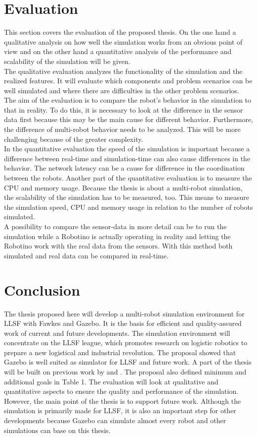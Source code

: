 \documentclass[11pt,a4paper]{article}
\begin{document}
\section{Evaluation}
This section covers the evaluation of the proposed thesis. On the one hand a qualitative analysis on how well the simulation works from an obvious point of view and on the other hand a quantitative analysis of the performance and scalability of the simulation will be given.\\
The qualitative evaluation analyzes the functionality of the simulation and the realized features. It will evaluate which components and problem scenarios can be well simulated and where there are difficulties in the other problem scenarios. The aim of the evaluation is to compare the robot's behavior in the simulation to that in reality. To do this, it is necessary to look at the difference in the sensor data first because this may be the main cause for different behavior. Furthermore, the difference of multi-robot behavior needs to be analyzed. This will be more challenging because of the greater complexity.\\
In the quantitative evaluation the speed of the simulation is important because a difference between real-time and simulation-time can also cause differences in the behavior. The network latency can be a cause for difference in the coordination between the robots. Another part of the quantitative evaluation is to measure the CPU and memory usage. Because the thesis is about a multi-robot simulation, the scalability of the simulation has to be measured, too. This means to measure the simulation speed, CPU and memory usage in relation to the number of robots simulated.\\
A possibility to compare the sensor-data in more detail can be to run the simulation while a Robotino is actually operating in reality and letting the Robotino work with the real data from the sensors. With this method both simulated and real data can be compared in real-time.

\section{Conclusion}
The thesis proposed here will develop a multi-robot simulation environment for LLSF with Fawkes and Gazebo. It is the basis for efficient and quality-assured work of current and future developments. The simulation environment will concentrate on the LLSF league, which promotes research on logistic robotics to prepare a new logistical and industrial revolution. The proposal showed that Gazebo is well suited as simulator for LLSF and future work. A part of the thesis will be built on previous work by \cite{KlingenDA} and \cite{MultiLevelAbstraction}. The proposal also defined minimum and additional goals in Table 1. The evaluation will look at qualitative and quantitative aspects to ensure the quality and performance of the simulation.\\
However, the main point of the thesis is to support future work. Although the simulation is primarily made for LLSF, it is also an important step for other developments because Gazebo can simulate almost every robot and other simulations can base on this thesis.




\end{document}
